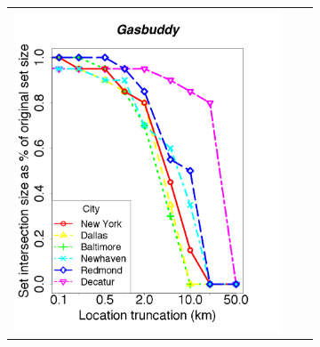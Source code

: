 \documentclass[10pt, conference, compsocconf]{IEEEtran}
\begin{document}
{\begin{figure}
\begin{subfigure}{\textwidth}
\begin{tabular}{ccc}
    \begin{minipage}{2in}
      \includegraphics[width=\textwidth]
                      {data/gasbuddy/plots/medians_across_city_si_20}
    \end{minipage}
    

\end{tabular}
\end{subfigure}
\end{figure}}
\end{document}
